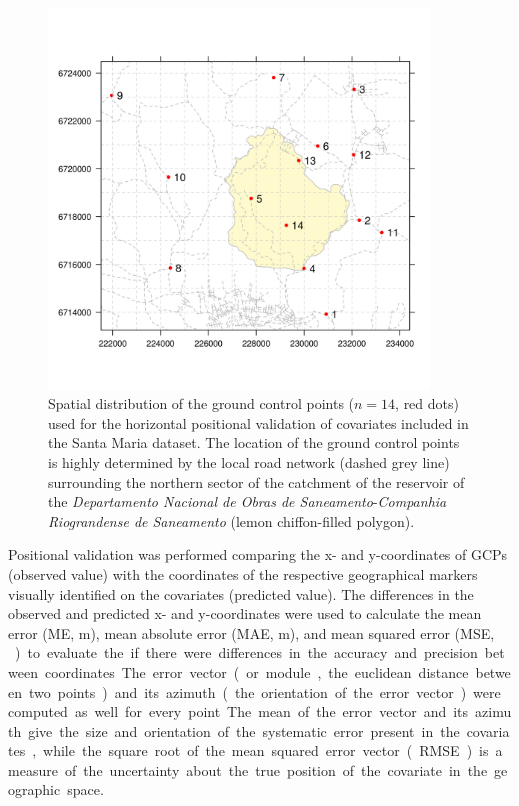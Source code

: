 \begin{figure}[!ht]
\centering
\includegraphics[width = 0.90\textwidth,trim=0 15mm 0 15mm, clip]{fig/chap05-field-gcps}
\caption[Ground control points used for the positional validation of the covariates.]{Spatial distribution of 
the ground control points ($n = 14$, red dots) used for the horizontal positional validation of covariates 
included in the Santa Maria dataset. The location of the ground control points is highly determined by the 
local road network (dashed grey line) surrounding the northern sector of the catchment of the reservoir of the 
\textit{Departamento Nacional de Obras de Saneamento}-\textit{Companhia Riograndense de Saneamento} (lemon 
chiffon-filled polygon).}
\label{fig:chap05-field-gcps}
\end{figure}



Positional validation was performed comparing the x- and y-coordinates of GCPs (observed value) with the 
coordinates of the respective geographical markers visually identified on the covariates (predicted value). 
The differences in the observed and predicted x- and y-coordinates were used to calculate the mean error (ME, 
\si{\m}), mean absolute error (MAE, \si{\m}), and mean squared error (MSE, \si{\m\square}) to evaluate the  if 
there were differences in the accuracy and precision between coordinates. The error vector (or module, the 
euclidean distance between two points) and its azimuth (the orientation of the error vector) were computed as 
well for every point. The mean of the error vector and its azimuth give the size and orientation of the 
systematic error present in the covariates, while the square root of the mean squared error vector (RMSE) is a 
measure of the uncertainty about the true position of the covariate in the geographic space.

